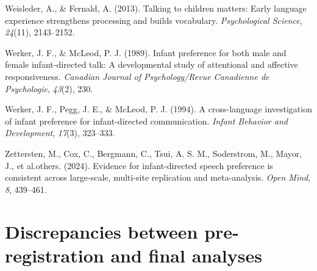 \documentclass[
  ,man,floatsintext]{apa6}
\newlength{\cslhangindent}
\newlength{\cslentryspacingunit} %
\newenvironment{CSLReferences}[2] %
 {%
  \setlength{\parindent}{0pt}
  \ifodd #1
  \let\oldpar\par
  \def\par{\hangindent=\cslhangindent\oldpar}
  \fi
  \setlength{\parskip}{#2\cslentryspacingunit}
 }%
 {}
\begin{document}
\begin{CSLReferences}{1}{0}
\leavevmode{}%
Weisleder, A., \& Fernald, A. (2013). Talking to children matters: Early language experience strengthens processing and builds vocabulary. \emph{Psychological Science}, \emph{24}(11), 2143--2152.

\leavevmode{}%
Werker, J. F., \& McLeod, P. J. (1989). Infant preference for both male and female infant-directed talk: A developmental study of attentional and affective responsiveness. \emph{Canadian Journal of Psychology/Revue Canadienne de Psychologie}, \emph{43}(2), 230.

\leavevmode{}%
Werker, J. F., Pegg, J. E., \& McLeod, P. J. (1994). A cross-language investigation of infant preference for infant-directed communication. \emph{Infant Behavior and Development}, \emph{17}(3), 323--333.

\leavevmode{}%
Zettersten, M., Cox, C., Bergmann, C., Tsui, A. S. M., Soderstrom, M., Mayor, J., et al.others. (2024). Evidence for infant-directed speech preference is consistent across large-scale, multi-site replication and meta-analysis. \emph{Open Mind}, \emph{8}, 439--461.

\end{CSLReferences}

\endgroup

\newpage

\newpage

\hypertarget{appendix-appendix}{%
\appendix}


\hypertarget{discrepancies-between-pre-registration-and-final-analyses}{%
\section{Discrepancies between pre-registration and final analyses}\label{discrepancies-between-pre-registration-and-final-analyses}}
\end{document}
